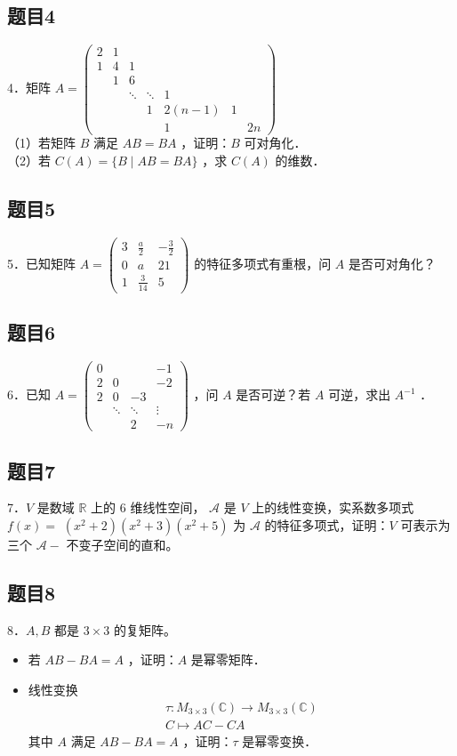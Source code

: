 \documentclass{article}
\begin{document}
\subsection{题目4}
4．矩阵 \(A=\left(\begin{array}{rrrrrrr}2 & 1 & & & & & \\ 1 & 4 & 1 & & & & \\ & 1 & 6 & & & & \\ & & \ddots & \ddots & 1 & & \\ & & & 1 & 2(n-1) & 1 \\ & & & & 1 & & 2 n\end{array}\right)\)\\
（1）若矩阵 \(B\) 满足 \(A B=B A\) ，证明：\(B\) 可对角化．\\
（2）若 \(C(A)=\{B \mid A B=B A\}\) ，求 \(C(A)\) 的维数．

\subsection{题目5}
5．已知矩阵 \(A=\left(\begin{array}{ccc}3 & \frac{a}{2} & -\frac{3}{2} \\ 0 & a & 21 \\ 1 & \frac{3}{14} & 5\end{array}\right)\) 的特征多项式有重根，问 \(A\) 是否可对角化？

\subsection{题目6}
6．已知 \(A=\left(\begin{array}{rrrr}0 & & & -1 \\ 2 & 0 & & -2 \\ 2 & 0 & -3 \\ & \ddots & \ddots & \vdots \\ & & 2 & -n\end{array}\right)\) ，问 \(A\) 是否可逆？若 \(A\) 可逆，求出 \(A^{-1}\) ．

\subsection{题目7}
7．\(V\) 是数域 \(\mathbb{R}\) 上的 6 维线性空间， \(\mathcal{A}\) 是 \(V\) 上的线性变换，实系数多项式 \(f(x)=\) \(\left(x^{2}+2\right)\left(x^{2}+3\right)\left(x^{2}+5\right)\) 为 \(\mathcal{A}\) 的特征多项式，证明：\(V\) 可表示为三个 \(\mathcal{A}-\) 不变子空间的直和。

\subsection{题目8}
8．\(A, B\) 都是 \(3 \times 3\) 的复矩阵。

\begin{itemize}
  \item[（1）] 若 \(A B-B A=A\) ，证明：\(A\) 是幂零矩阵．
  \item[（2）] 线性变换
\[
\begin{gathered}
\tau: M_{3 \times 3}(\mathbb{C}) \rightarrow M_{3 \times 3}(\mathbb{C}) \\
C \mapsto A C-C A
\end{gathered}
\]
其中 \(A\) 满足 \(A B-B A=A\) ，证明：\(\tau\) 是幂零变换．
\end{itemize}
\end{document}
